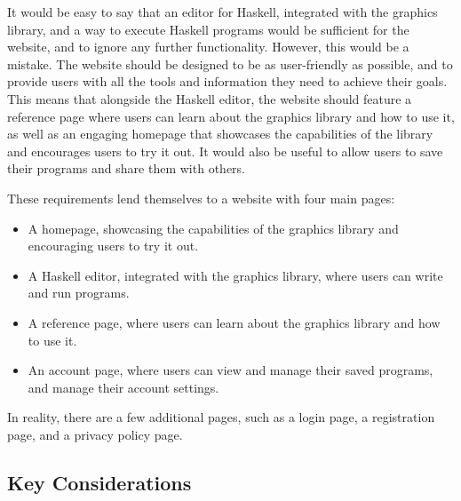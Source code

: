 \documentclass[../main.tex]{subfiles}
\begin{document}
            It would be easy to say that an editor for Haskell, integrated with the
                graphics library, and a way to execute Haskell programs would be sufficient for
                the website, and to ignore any further functionality.
            However, this would be a mistake.
            The website should be designed to be as user-friendly as possible, and to
                provide users with all the tools and information they need to achieve their
                goals.
            This means that alongside the Haskell editor, the website should feature a
                reference page where users can learn about the graphics library and how to use
                it, as well as an engaging homepage that showcases the capabilities of the
                library and encourages users to try it out.
            It would also be useful to allow users to save their programs and share them
                with others.

            These requirements lend themselves to a website with four main pages:
            \begin{itemize}
                \item A homepage, showcasing the capabilities of the graphics library and
                      encouraging users to try it out.
                \item A Haskell editor, integrated with the graphics library, where users can
                      write and run programs.
                \item A reference page, where users can learn about the graphics library
                      and how to use it.
                \item An account page, where users can view and manage their saved programs,
                      and manage their account settings.
            \end{itemize}
            In reality, there are a few additional pages, such as a login page, a
                registration page, and a privacy policy page.

        \subsection{Key Considerations}
\end{document}
